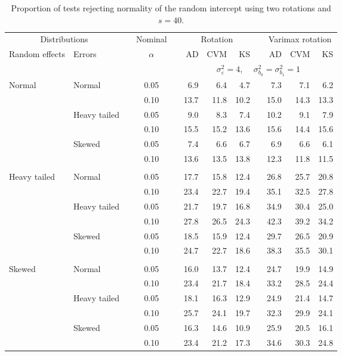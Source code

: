 \begin{table}[ht]
\centering
\caption{\label{tab:fixedsimb040} Proportion of tests rejecting normality of the random intercept using two rotations and $s = 40$.}
\begin{scriptsize}
\begin{tabular}{ll p{.1cm} c p{.1cm} rrr p{.1cm} rrr}
  \hline
  \multicolumn{2}{c}{Distributions}& & Nominal & &  \multicolumn{3}{c}{Rotation} & & \multicolumn{3}{c}{Varimax rotation} \\ \cline{1-2} \cline{6-8} \cline{10-12}   
  Random effects & Errors & & $\alpha$ & & AD & CVM & KS & & AD & CVM & KS \\ 
   \hline
& && && \multicolumn{7}{c}{$\sigma_{\varepsilon}^2 = 4$, \ \ $\sigma_{b_0}^2 = \sigma_{b_1}^2 = 1$} \\ \cline{6-12}
\rowcolor{gray!20}Normal & Normal &  & 0.05 &  & 6.9 & 6.4 & 4.7 &  & 7.3 & 7.1 & 6.2 \\ 
\rowcolor{gray!20}   &  &  & 0.10 &  & 13.7 & 11.8 & 10.2 &  & 15.0 & 14.3 & 13.3 \\ 
\rowcolor{gray!20}   & Heavy tailed &  & 0.05 &  & 9.0 & 8.3 & 7.4 &  & 10.2 & 9.1 & 7.9 \\ 
\rowcolor{gray!20}   &  &  & 0.10 &  & 15.5 & 15.2 & 13.6 &  & 15.6 & 14.4 & 15.6 \\ 
\rowcolor{gray!20}   & Skewed &  & 0.05 &  & 7.4 & 6.6 & 6.7 &  & 6.9 & 6.6 & 6.1 \\ 
\rowcolor{gray!20}   &  &  & 0.10 &  & 13.6 & 13.5 & 13.8 &  & 12.3 & 11.8 & 11.5 \\ 
&&&&&&&&&&&\\
  Heavy tailed & Normal &  & 0.05 &  & 17.7 & 15.8 & 12.4 &  & 26.8 & 25.7 & 20.8 \\ 
   &  &  & 0.10 &  & 23.4 & 22.7 & 19.4 &  & 35.1 & 32.5 & 27.8 \\ 
   & Heavy tailed &  & 0.05 &  & 21.7 & 19.7 & 16.8 &  & 34.9 & 30.4 & 25.0 \\ 
   &  &  & 0.10 &  & 27.8 & 26.5 & 24.3 &  & 42.3 & 39.2 & 34.2 \\ 
   & Skewed &  & 0.05 &  & 18.5 & 15.9 & 12.4 &  & 29.7 & 26.5 & 20.9 \\ 
   &  &  & 0.10 &  & 24.7 & 22.7 & 18.6 &  & 38.3 & 35.5 & 30.1 \\ 
&&&&&&&&&&&\\
  Skewed & Normal &  & 0.05 &  & 16.0 & 13.7 & 12.4 &  & 24.7 & 19.9 & 14.9 \\ 
   &  &  & 0.10 &  & 23.4 & 21.7 & 18.4 &  & 33.2 & 28.5 & 24.4 \\ 
   & Heavy tailed &  & 0.05 &  & 18.1 & 16.3 & 12.9 &  & 24.9 & 21.4 & 14.7 \\ 
   &  &  & 0.10 &  & 25.7 & 24.1 & 19.7 &  & 32.3 & 29.9 & 24.1 \\ 
   & Skewed &  & 0.05 &  & 16.3 & 14.6 & 10.9 &  & 25.9 & 20.5 & 16.1 \\ 
   &  &  & 0.10 &  & 23.4 & 21.2 & 17.3 &  & 34.6 & 30.3 & 24.8 \\ 



\end{tabular}
\end{scriptsize}
\end{table}
